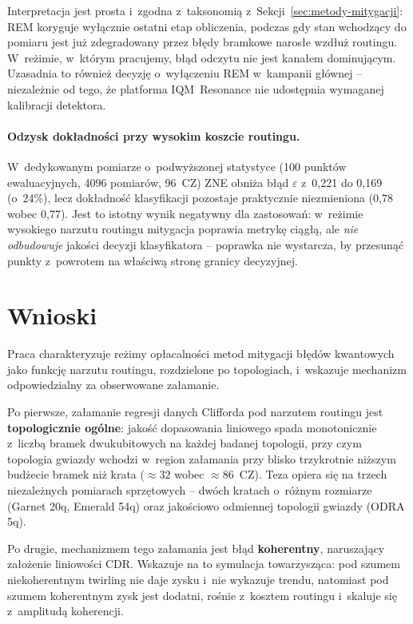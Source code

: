 \documentclass[11pt]{article}
\begin{document}
Interpretacja jest prosta i~zgodna z~taksonomią z~Sekcji~\ref{sec:metody-mitygacji}: REM koryguje
wyłącznie ostatni etap obliczenia, podczas gdy stan wchodzący do pomiaru jest już zdegradowany przez
błędy bramkowe narosłe wzdłuż routingu. W~reżimie, w~którym pracujemy, błąd odczytu nie jest kanałem
dominującym. Uzasadnia to również decyzję o~wyłączeniu REM w~kampanii głównej -- niezależnie od
tego, że platforma IQM~Resonance nie udostępnia wymaganej kalibracji detektora.

\paragraph{Odzysk dokładności przy wysokim koszcie routingu.} W~dedykowanym pomiarze
o~podwyższonej statystyce (100 punktów ewaluacyjnych, 4096 pomiarów, 96~CZ) ZNE obniża błąd
$\varepsilon$ z~0{,}221 do 0{,}169 (o~24\%), lecz dokładność klasyfikacji pozostaje praktycznie
niezmieniona (0{,}78 wobec 0{,}77). Jest to istotny wynik negatywny dla zastosowań: w~reżimie
wysokiego narzutu routingu mitygacja poprawia metrykę ciągłą, ale \emph{nie odbudowuje} jakości
decyzji klasyfikatora -- poprawka nie wystarcza, by przesunąć punkty z~powrotem na właściwą stronę
granicy decyzyjnej.

\section{Wnioski}\label{sec:wnioski}

Praca charakteryzuje reżimy opłacalności metod mitygacji błędów kwantowych jako funkcję narzutu
routingu, rozdzielone po topologiach, i~wskazuje mechanizm odpowiedzialny za obserwowane załamanie.

Po pierwsze, załamanie regresji danych Clifforda pod narzutem routingu jest \textbf{topologicznie
ogólne}: jakość dopasowania liniowego spada monotonicznie z~liczbą bramek dwukubitowych na każdej
badanej topologii, przy czym topologia gwiazdy wchodzi
w~region załamania przy blisko trzykrotnie niższym budżecie bramek niż krata ($\approx32$ wobec
$\approx86$~CZ). Teza opiera się na
trzech niezależnych pomiarach sprzętowych -- dwóch kratach o~różnym rozmiarze (Garnet 20q,
Emerald 54q) oraz jakościowo odmiennej topologii gwiazdy (ODRA 5q).

Po drugie, mechanizmem tego załamania jest błąd \textbf{koherentny}, naruszający założenie liniowości
CDR. Wskazuje na to symulacja towarzysząca: pod szumem niekoherentnym twirling nie daje zysku
i~nie wykazuje trendu, natomiast pod szumem koherentnym zysk jest dodatni, rośnie z~kosztem routingu
i~skaluje się z~amplitudą koherencji.
\end{document}
